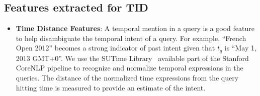 \documentclass{sig-alternate}
\begin{document}
\subsection{Features extracted for TID}\label{sec:tid features}
\begin{itemize}
\item\textbf{Time Distance Features}: A temporal mention in a query is a good feature to help disambiguate the temporal intent of a query. For example, ``French Open 2012'' becomes a strong indicator of past intent given that $t_{q}$ is ``May 1, 2013 GMT+0''. We use the SUTime Library~\cite{sutime} available part of the Stanford CoreNLP pipeline to recognize and normalize temporal expressions in the queries.
The distance of the normalized time expressions from the query hitting time is measured to provide an estimate of the intent.


\end{itemize}
\end{document}
